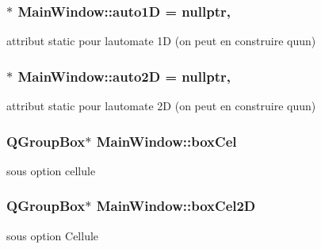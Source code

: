 \subsubsection[{\texorpdfstring{auto1D}{auto1D}}]{ $\ast$ Main\+Window\+::auto1D = nullptr\hspace{0.3cm}{\ttfamily [static]}, {\ttfamily [private]}}\hypertarget{class_main_window_a252b3e10b17bf529c25b4e72be4b4332}{}\label{class_main_window_a252b3e10b17bf529c25b4e72be4b4332}
attribut static pour l\textquotesingle{}automate 1D (on peut en construire qu\textquotesingle{}un) 
\subsubsection[{\texorpdfstring{auto2D}{auto2D}}]{ $\ast$ Main\+Window\+::auto2D = nullptr\hspace{0.3cm}{\ttfamily [static]}, {\ttfamily [private]}}\hypertarget{class_main_window_ae1a48aa4de447712675f3aa2d7482034}{}\label{class_main_window_ae1a48aa4de447712675f3aa2d7482034}
attribut static pour l\textquotesingle{}automate 2D (on peut en construire qu\textquotesingle{}un) 
\subsubsection[{\texorpdfstring{box\+Cel}{boxCel}}]{\setlength{\rightskip}{0pt plus 5cm}Q\+Group\+Box$\ast$ Main\+Window\+::box\+Cel\hspace{0.3cm}{\ttfamily [private]}}\hypertarget{class_main_window_ac7c010cdcd4cafe4a9ac0b87ad384b8a}{}\label{class_main_window_ac7c010cdcd4cafe4a9ac0b87ad384b8a}
sous option cellule 
\subsubsection[{\texorpdfstring{box\+Cel2D}{boxCel2D}}]{\setlength{\rightskip}{0pt plus 5cm}Q\+Group\+Box$\ast$ Main\+Window\+::box\+Cel2D\hspace{0.3cm}{\ttfamily [private]}}\hypertarget{class_main_window_a1d591f82ca53c455c4a5204f8baad925}{}\label{class_main_window_a1d591f82ca53c455c4a5204f8baad925}
sous option Cellule 
